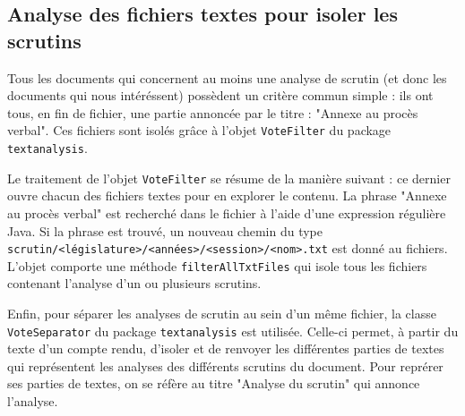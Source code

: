\subsection{Analyse des fichiers textes pour isoler les scrutins}

Tous les documents qui concernent au moins une analyse de scrutin (et donc les documents qui nous intéréssent) possèdent un critère commun simple : ils ont tous, en fin de fichier, une partie annoncée par le titre : "Annexe au procès verbal". Ces fichiers sont isolés grâce à l'objet \verb|VoteFilter| du package \verb|textanalysis|.

Le traitement de l'objet \verb|VoteFilter| se résume de la manière suivant : ce dernier ouvre chacun des fichiers textes pour en explorer le contenu. La phrase "Annexe au procès verbal" est recherché dans le fichier à l'aide d'une expression régulière Java. Si la phrase est trouvé, un nouveau chemin du type \verb|scrutin/<législature>/<années>/<session>/<nom>.txt| est donné au fichiers. L'objet comporte une méthode \verb|filterAllTxtFiles| qui isole tous les fichiers contenant l'analyse d'un ou plusieurs scrutins.

Enfin, pour séparer les analyses de scrutin au sein d'un même fichier, la classe \verb|VoteSeparator| du package \verb|textanalysis| est utilisée. Celle-ci permet, à partir du texte d'un compte rendu, d'isoler et de renvoyer les différentes parties de textes qui représentent les analyses des différents scrutins du document. Pour reprérer ses parties de textes, on se réfère au titre "Analyse du scrutin" qui annonce l'analyse.
